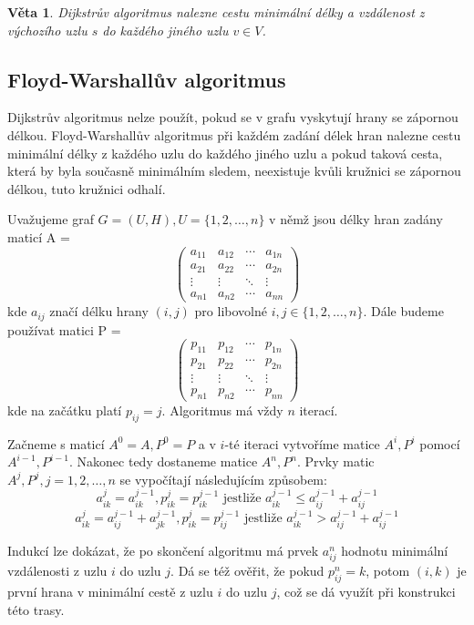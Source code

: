 \documentclass[a4paper, 11pt]{report}
\newtheorem{veta}{Věta}[chapter]
\begin{document}
\begin{veta}
Dijkstrův algoritmus nalezne cestu minimální délky a vzdálenost z výchozího uzlu $s$ do každého jiného uzlu $v \in V$.
\end{veta}

\subsection{Floyd-Warshallův algoritmus}
Dijkstrův algoritmus nelze použít, pokud se v grafu vyskytují hrany se zápornou délkou. Floyd-Warshallův algoritmus při každém zadání délek hran nalezne cestu minimální délky z každého uzlu do každého jiného uzlu a pokud taková cesta, která by byla současně minimálním sledem, neexistuje kvůli kružnici se zápornou délkou, tuto kružnici odhalí.

Uvažujeme graf $G = (U, H), U = \{1, 2, \dots, n\}$ v němž jsou délky hran zadány maticí
A = $$
 \begin{pmatrix}
  a_{11} & a_{12} & \cdots & a_{1n} \\
  a_{21} & a_{22} & \cdots & a_{2n} \\
  \vdots & \vdots & \ddots & \vdots \\
  a_{n1} & a_{n2} & \cdots & a_{nn}
 \end{pmatrix}
$$
kde $a_{ij}$ značí délku hrany $(i, j)$ pro libovolné $i, j \in \{1, 2, \dots, n\}$. Dále budeme používat matici
P = $$
 \begin{pmatrix}
  p_{11} & p_{12} & \cdots & p_{1n} \\
  p_{21} & p_{22} & \cdots & p_{2n} \\
  \vdots & \vdots & \ddots & \vdots \\
  p_{n1} & p_{n2} & \cdots & p_{nn}
 \end{pmatrix}
$$
kde na začátku platí $p_{ij} = j$. Algoritmus má vždy $n$ iterací.

Začneme s maticí $A^0 = A, P^0 = P$ a v $i$-té iteraci vytvoříme matice $A^i, P^i$ pomocí $A^{i-1}, P^{i-1}$. Nakonec tedy dostaneme matice $A^n, P^n$. Prvky matic $A^j, P^j, j = 1, 2, \dots, n$ se vypočítají následujícím způsobem:
$$a_{ik}^j = a_{ik}^{j-1}, p_{ik}^j = p_{ik}^{j-1} \text{ jestliže } a_{ik}^{j-1} \leq a_{ij}^{j-1} + a_{ij}^{j-1}$$
$$a_{ik}^j = a_{ij}^{j-1} + a_{jk}^{j-1}, p_{ik}^j = p_{ij}^{j-1} \text{ jestliže } a_{ik}^{j-1} > a_{ij}^{j-1} + a_{ij}^{j-1}$$

Indukcí lze dokázat, že po skončení algoritmu má prvek $a_{ij}^n$ hodnotu minimální vzdálenosti z uzlu $i$ do uzlu $j$. Dá se též ověřit, že pokud $p_{ij}^n = k$, potom $(i,k)$ je první hrana v minimální cestě z uzlu $i$ do uzlu $j$, což se dá využít při konstrukci této trasy.
\end{document}
